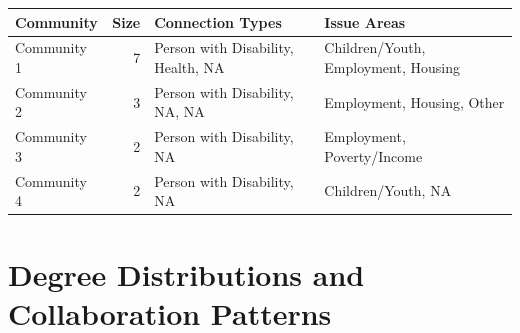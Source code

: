 \documentclass[
  letterpaper,
  DIV=11,
  numbers=noendperiod]{scrartcl}
\begin{document}
\begin{longtable*}[t]{lrll}
\toprule
Community & Size & Connection Types & Issue Areas\\
\midrule
Community 1 & 7 & Person with Disability, Health, NA & Children/Youth, Employment, Housing\\
Community 2 & 3 & Person with Disability, NA, NA & Employment, Housing, Other\\
Community 3 & 2 & Person with Disability, NA & Employment, Poverty/Income\\
Community 4 & 2 & Person with Disability, NA & Children/Youth, NA\\
\bottomrule
\end{longtable*}

\section{Degree Distributions and Collaboration
Patterns}\label{degree-distributions-and-collaboration-patterns}
\end{document}
